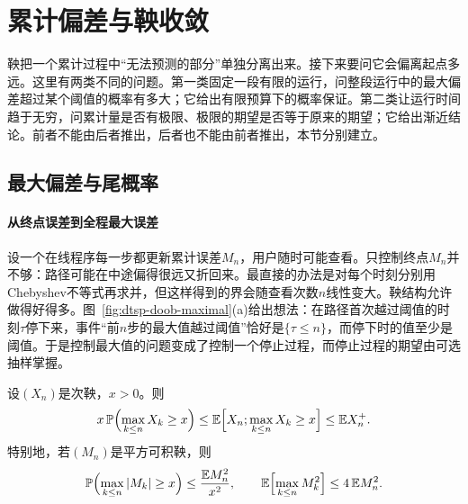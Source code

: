 \section{累计偏差与鞅收敛}
\label{sec:dtsp-deviation}

鞅把一个累计过程中“无法预测的部分”单独分离出来。接下来要问它会偏离起点多远。这里有两类不同的问题。第一类固定一段有限的运行，问整段运行中的最大偏差超过某个阈值的概率有多大；它给出有限预算下的概率保证。第二类让运行时间趋于无穷，问累计量是否有极限、极限的期望是否等于原来的期望；它给出渐近结论。前者不能由后者推出，后者也不能由前者推出，本节分别建立。

\subsection{最大偏差与尾概率}
\label{sec:dtsp-maximal-tail}
\label{sec:rv-anytime}
\label{sec:stoch-self-normalized-adaptive-design}

\paragraph{从终点误差到全程最大误差}
设一个在线程序每一步都更新累计误差$M_n$，用户随时可能查看。只控制终点$M_n$并不够：路径可能在中途偏得很远又折回来。最直接的办法是对每个时刻分别用Chebyshev不等式再求并，但这样得到的界会随查看次数$n$线性变大。鞅结构允许做得好得多。图~\ref{fig:dtsp-doob-maximal}(a)给出想法：在路径首次越过阈值的时刻$\tau$停下来，事件“前$n$步的最大值越过阈值”恰好是$\{\tau\leq n\}$，而停下时的值至少是阈值。于是控制最大值的问题变成了控制一个停止过程，而停止过程的期望由可选抽样掌握。

\begin{theorem}[Doob最大不等式]
  \label{thm:dtsp-doob-maximal}
  设$(X_n)$是次鞅，$x>0$。则
  \[
    x\,\mathbb P\Bigl(\max_{k\leq n}X_k\geq x\Bigr)\leq\mathbb E\Bigl[X_n;\max_{k\leq n}X_k\geq x\Bigr]\leq\mathbb EX_n^{+}.
  \]
  特别地，若$(M_n)$是平方可积鞅，则
  \begin{equation}
    \mathbb P\Bigl(\max_{k\leq n}|M_k|\geq x\Bigr)\leq\frac{\mathbb EM_n^2}{x^2},\qquad
    \mathbb E\Bigl[\max_{k\leq n}M_k^2\Bigr]\leq4\,\mathbb EM_n^2.
    \label{eq:dtsp-doob-l2}
  \end{equation}
\end{theorem}

